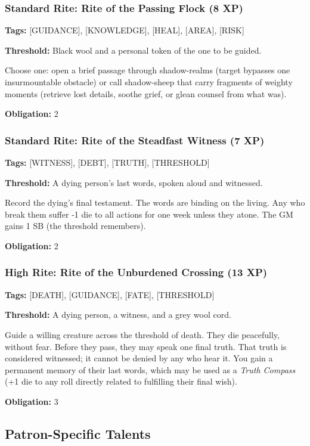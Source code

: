 \subsubsection{Standard Rite: Rite of the Passing Flock (8 XP)}

\textbf{Tags:} [GUIDANCE], [KNOWLEDGE], [HEAL], [AREA], [RISK]

\textbf{Threshold:} Black wool and a personal token of the one to be guided.

Choose one: open a brief passage through shadow-realms (target bypasses one insurmountable obstacle) or call shadow-sheep that carry fragments of weighty moments (retrieve lost details, soothe grief, or glean counsel from what was).

\textbf{Obligation:} 2

\subsubsection{Standard Rite: Rite of the Steadfast Witness (7 XP)}

\textbf{Tags:} [WITNESS], [DEBT], [TRUTH], [THRESHOLD]

\textbf{Threshold:} A dying person's last words, spoken aloud and witnessed.

Record the dying's final testament. The words are binding on the living. Any who break them suffer -1 die to all actions for one week unless they atone. The GM gains 1 SB (the threshold remembers).

\textbf{Obligation:} 2

\subsubsection{High Rite: Rite of the Unburdened Crossing (13 XP)}

\textbf{Tags:} [DEATH], [GUIDANCE], [FATE], [THRESHOLD]

\textbf{Threshold:} A dying person, a witness, and a grey wool cord.

Guide a willing creature across the threshold of death. They die peacefully, without fear. Before they pass, they may speak one final truth. That truth is considered witnessed; it cannot be denied by any who hear it. You gain a permanent memory of their last words, which may be used as a \textit{Truth Compass} (+1 die to any roll directly related to fulfilling their final wish).

\textbf{Obligation:} 3

\subsection{Patron-Specific Talents}

